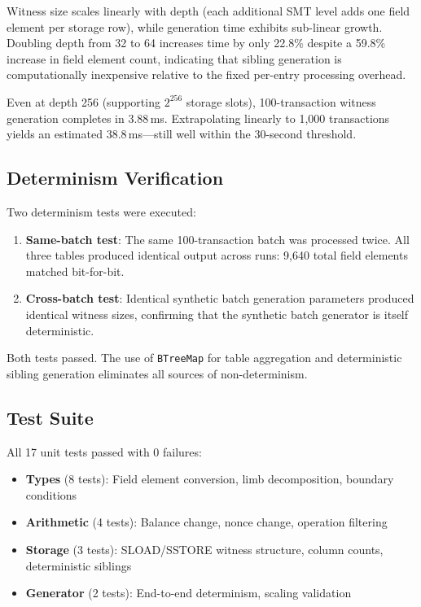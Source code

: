 \documentclass[conference]{IEEEtran}
\begin{document}
Witness size scales linearly with depth (each additional SMT level adds
one field element per storage row), while generation time exhibits
sub-linear growth. Doubling depth from 32 to 64 increases time by
only 22.8\% despite a 59.8\% increase in field element count,
indicating that sibling generation is computationally inexpensive
relative to the fixed per-entry processing overhead.

Even at depth 256 (supporting $2^{256}$ storage slots), 100-transaction
witness generation completes in 3.88\,ms. Extrapolating linearly to
1{,}000 transactions yields an estimated 38.8\,ms---still well within
the 30-second threshold.

\subsection{Determinism Verification}

Two determinism tests were executed:

\begin{enumerate}
\item \textbf{Same-batch test}: The same 100-transaction batch was
      processed twice. All three tables produced identical output across
      runs: 9{,}640 total field elements matched bit-for-bit.
\item \textbf{Cross-batch test}: Identical synthetic batch generation
      parameters produced identical witness sizes, confirming that the
      synthetic batch generator is itself deterministic.
\end{enumerate}

Both tests passed. The use of \texttt{BTreeMap} for table aggregation
and deterministic sibling generation eliminates all sources of
non-determinism.

\subsection{Test Suite}

All 17 unit tests passed with 0 failures:

\begin{itemize}
\item \textbf{Types} (8 tests): Field element conversion, limb
      decomposition, boundary conditions
\item \textbf{Arithmetic} (4 tests): Balance change, nonce change,
      operation filtering
\item \textbf{Storage} (3 tests): SLOAD/SSTORE witness structure,
      column counts, deterministic siblings
\item \textbf{Generator} (2 tests): End-to-end determinism, scaling
      validation
\end{itemize}
\end{document}
